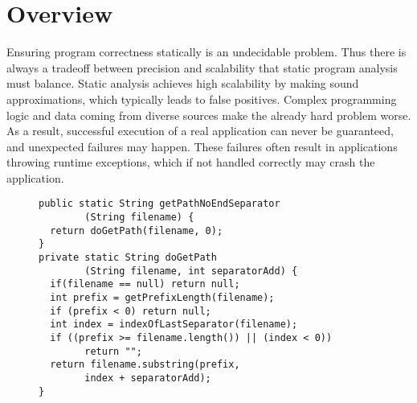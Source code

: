 \section{Overview}
\label{sec:overview}

Ensuring program correctness statically is an undecidable problem. Thus there is
always a tradeoff between precision and scalability that static program analysis
must balance. Static analysis achieves high scalability by making sound
approximations, which typically leads to false positives. Complex programming
logic and data coming from diverse sources make the already hard problem worse.
As a result, successful execution of a real application can never be guaranteed,
and unexpected failures may happen. These failures often result in applications
throwing runtime exceptions, which if not handled correctly may crash the
application.



\begin{figure}[t]
\centering
\begin{lstlisting}
public static String getPathNoEndSeparator
        (String filename) {
  return doGetPath(filename, 0);
}
private static String doGetPath
        (String filename, int separatorAdd) {
  if(filename == null) return null;
  int prefix = getPrefixLength(filename);
  if (prefix < 0) return null;
  int index = indexOfLastSeparator(filename);
  if ((prefix >= filename.length()) || (index < 0))
        return "";
  return filename.substring(prefix,
        index + separatorAdd);
}
\end{lstlisting}
\end{figure}

